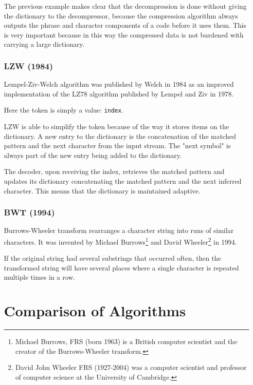 \documentclass[12pt, a4paper]{report}
\begin{document}
The previous example makes clear that the decompression is done without giving the dictionary to the decompressor, because the
compression algorithm always outputs the phrase and character components of a code before it uses them.
This is very important because in this way the compressed data is not burdened with carrying a large dictionary.

\subsubsection{LZW (1984)}

Lempel-Ziv-Welch algorithm was published by Welch in 1984 as an improved implementation of the LZ78 algorithm published by Lempel
and Ziv in 1978.

Here the token is simply a value: \texttt{index}.

LZW is able to simplify the token because of the way it stores items on the dictionary.
A new entry to the dictionary is the concatenation of the matched pattern and the next character from the input stream.
The "next symbol" is always part of the new entry being added to the dictionary.

The decoder, upon receiving the index, retrieves the matched pattern and updates its dictionary concatenating the matched pattern
and the next inferred character. This means that the dictionary is maintained adaptive.

\subsubsection{BWT (1994)}

Burrows-Wheeler transform rearranges a character string into runs of similar characters.
It was invented by Michael Burrows\footnote{Michael Burrows, FRS (born 1963) is a British computer scientist and the creator of
the Burrows-Wheeler transform.} and David Wheeler\footnote{David John Wheeler FRS (1927-2004) was a computer scientist and
professor of computer science at the University of Cambridge.} in 1994.

If the original string had several substrings that occurred often, then the transformed string will have several places where a
single character is repeated multiple times in a row.

\section{Comparison of Algorithms}
\end{document}
